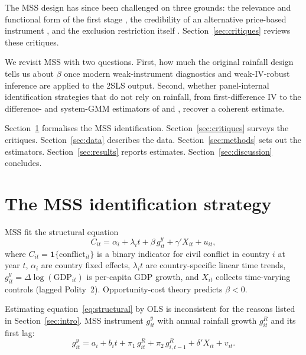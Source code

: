 \documentclass[11pt,a4paper]{article}
\begin{document}
The MSS design has since been challenged on three grounds: the
relevance and functional form of the first stage \citep{Ciccone2011},
the credibility of an alternative price-based instrument
\citep{BrucknerCiccone2010}, and the exclusion restriction itself
\citep{Sarsons2015}. Section~\ref{sec:critiques} reviews these
critiques.

We revisit MSS with two questions. First, how much the original
rainfall design tells us about $\beta$ once modern weak-instrument
diagnostics and weak-IV-robust inference are applied to the 2SLS
output. Second, whether panel-internal identification strategies that
do not rely on rainfall, from \citet{AndersonHsiao1981}
first-difference IV to the difference- and system-GMM estimators of
\citet{ArellanoBond1991} and \citet{BlundellBond1998}, recover a
coherent estimate.

Section~\ref{sec:identification} formalises the MSS identification.
Section~\ref{sec:critiques} surveys the critiques.
Section~\ref{sec:data} describes the data. Section~\ref{sec:methods}
sets out the estimators. Section~\ref{sec:results} reports estimates.
Section~\ref{sec:discussion} concludes.

\section{The MSS identification strategy}\label{sec:identification}
MSS fit the structural equation
\begin{equation}
C_{it} = \alpha_i + \lambda_i t + \beta\, g^{y}_{it} + \gamma' X_{it} + u_{it},
\label{eq:structural}
\end{equation}
where $C_{it} = \mathbf{1}\{\text{conflict}_{it}\}$ is a binary indicator for civil
conflict in country $i$ at year $t$, $\alpha_i$ are country fixed effects, $\lambda_i t$ are country-specific linear time trends, $g^{y}_{it} = \Delta \log(\text{GDP}_{it})$ is per-capita GDP growth, and $X_{it}$ collects time-varying controls (lagged Polity~2). Opportunity-cost theory \citep{Grossman1991} predicts
$\beta < 0$.

Estimating equation~\eqref{eq:structural} by OLS is inconsistent for the reasons
listed in Section~\ref{sec:intro}. MSS instrument $g^{y}_{it}$ with annual
rainfall growth $g^{R}_{it}$ and its first lag:
\begin{equation}
g^{y}_{it} = a_i + b_i t + \pi_1\, g^{R}_{it} + \pi_2\, g^{R}_{i,t-1}
             + \delta' X_{it} + v_{it}.
\label{eq:firststage}
\end{equation}
\end{document}
